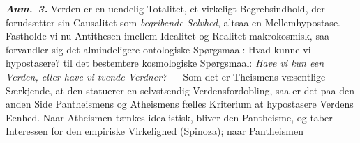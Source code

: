 \documentclass[12pt]{book}
\newcommand{\anm}[1]{\emph{\textbf{Anm.~#1.}}}
\begin{document}
\anm{3} Verden er en uendelig Totalitet, et virkeligt Begrebsindhold, der forudsætter sin
Causalitet som \emph{begribende Selvhed}, altsaa en Mellemhypostase. Fastholde vi nu
Antithesen imellem Idealitet og Realitet makrokosmisk, saa forvandler sig det
almindeligere ontologiske Spørgsmaal: Hvad kunne vi hypostasere? til det bestemtere
kosmologiske Spørgsmaal: \emph{Have vi kun een Verden, eller have vi tvende Verdner?} ---
Som det er Theismens væsentlige Særkjende, at den statuerer en selvstændig
Verdensfordobling, saa er det paa den anden Side Pantheismens og Atheismens fælles
Kriterium at hypostasere Verdens Eenhed. Naar Atheismen tænkes idealistisk, bliver den
Pantheisme, og taber Interessen for den empiriske Virkelighed (Spinoza); naar Pantheismen
%
\end{document}
